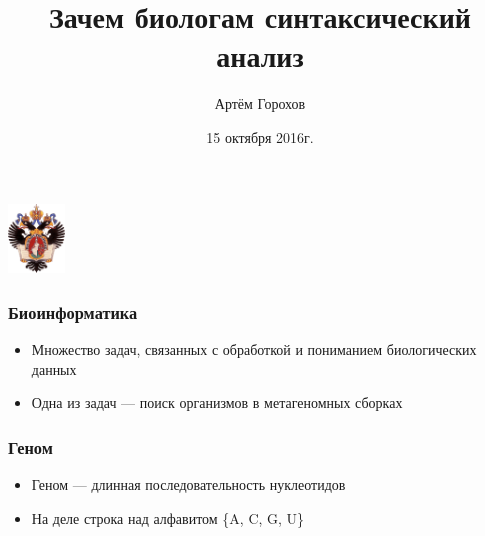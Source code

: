 \documentclass{beamer}
\title[]{Зачем биологам синтаксический анализ}
\institute[СПбГУ]{
    Санкт-Петербургский государственный университет \\
    Лаборатория языковых инструментов JetBrains}
\author[Артём Горохов]{Артём Горохов}
\date{15 октября 2016г.}
\begin{document}
    

\begin{frame}
    \begin{center}
        {\includegraphics[width=1.5cm]{pictures/SPbGU_Logo.png}}
    \end{center}
    \titlepage
\end{frame}

\begin{frame}
   	\frametitle{Биоинформатика}
   	\begin{itemize}
        \item Множество задач, связанных с обработкой и пониманием биологических данных
   		\item Одна из задач --- поиск организмов в метагеномных сборках
   	\end{itemize}
\end{frame}

\begin{frame}
    \frametitle{Геном}
    \begin{itemize}
        \item Геном --- длинная последовательность нуклеотидов
        \item На деле строка над алфавитом \{A, C, G, U\}
    \end{itemize}
\end{frame}
\end{document}
